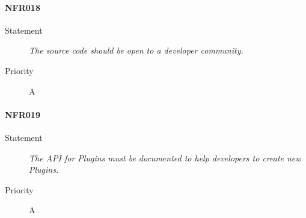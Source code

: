 \paragraph{NFR018}
\begin{description}
  \item [Statement] \textit{The source code should be open to a developer community.}
  \item [Priority] A
\end{description}

\paragraph{NFR019}
\begin{description}
  \item [Statement] \textit{The \gls{API} for \gls{Plugins} must be documented to help developers to create new \gls{Plugins}.}
  \item [Priority] A
\end{description}


